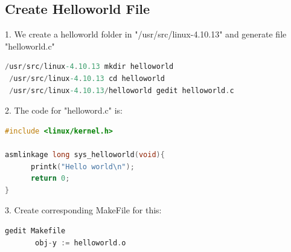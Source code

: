 \documentclass[12pt,a4paper]{article}
\begin{document}
\subsection{Create Helloworld File}
1. We create a helloworld folder in "/usr/src/linux-4.10.13" and generate file "helloworld.c"
\begin{lstlisting}[language = C]
 /usr/src/linux-4.10.13 mkdir helloworld
 /usr/src/linux-4.10.13 cd helloworld
 /usr/src/linux-4.10.13/helloworld gedit helloworld.c
\end{lstlisting}

2. The code for "helloword.c" is: 

\begin{lstlisting}[language = C]
#include <linux/kernel.h>

asmlinkage long sys_helloworld(void){
      printk("Hello world\n");
      return 0;
}
\end{lstlisting}

3. Create corresponding MakeFile for this:

\begin{lstlisting}[language = C]
 gedit Makefile
       obj-y := helloworld.o
\end{lstlisting}
\end{document}
